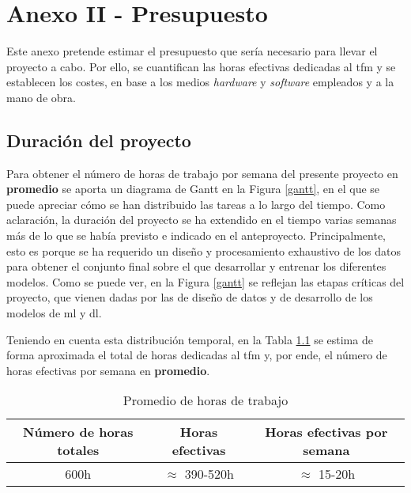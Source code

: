 \chapter{Anexo II - Presupuesto}

Este anexo pretende estimar el presupuesto que sería necesario para llevar el proyecto a cabo. Por ello, se cuantifican las horas efectivas dedicadas al \gls{tfm} y se establecen los costes, en base a los medios \textit{hardware} y \textit{software} empleados y a la mano de obra.

\section{Duración del proyecto}

Para obtener el número de horas de trabajo por semana del presente proyecto en \textbf{promedio} se aporta un diagrama de Gantt en la Figura \ref{gantt}, en el que se puede apreciar cómo se han distribuido las tareas a lo largo del tiempo. Como aclaración, la duración del proyecto se ha extendido en el tiempo varias semanas más de lo que se había previsto e indicado en el anteproyecto. Principalmente, esto es porque se ha requerido un diseño y procesamiento exhaustivo de los datos para obtener el conjunto final sobre el que desarrollar y entrenar los diferentes modelos. Como se puede ver, en la Figura \ref{gantt} se reflejan las etapas críticas del proyecto, que vienen dadas por las de diseño de datos y de desarrollo de los modelos de \gls{ml} y \gls{dl}. 

\vspace{3mm}

Teniendo en cuenta esta distribución temporal, en la Tabla \ref{dig:horasTrabajadas} se estima de forma aproximada el total de horas dedicadas al \gls{tfm} y, por ende, el número de horas efectivas por semana en \textbf{promedio}.

\vspace{3mm}

\begin{table}[ht!]
    \centering
    \begin{tabular}{|c|c|c|}
    \hline
    \rowcolor[HTML]{EFEFEF}
    \textbf{Número de horas totales} & \textbf{Horas efectivas} & \textbf{Horas efectivas por semana} \\ \hline
                    600h      & $\approx$ 390-520h   &     $\approx$         15-20h             \\ \hline
    \end{tabular}
    \caption{Promedio de horas de trabajo }
    \label{dig:horasTrabajadas}
\end{table}


